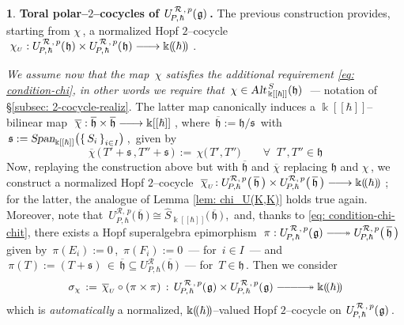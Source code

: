 \documentclass[12pt,reqno,twoside,a4paper]{amsart}
\numberwithin{equation}{section}
\theoremstyle{definition}
\newtheorem{free text}[lema]{}
\theoremstyle{remark}
\newcommand{\R}{{\mathcal R}}
\def \kh{{\Bbbk[[\hbar]]}}
\def \khp{{\Bbbk(\hskip-1,7pt(\hbar)\hskip-1,7pt)}}
\def \lieg{\mathfrak{g}}
\def \lieh{\mathfrak{h}}
\def \lies{\mathfrak{s}}
\def \uRpPhg{U^{\,\R\,,\,p}_{\!P,\hskip0,7pt\hbar}(\hskip0,5pt\lieg)}
\def \uRpPhh{U^{\,\R\,,\,p}_{\!P,\hskip0,7pt\hbar}(\hskip0,5pt\lieh)}
\theoremstyle{plain}
\begin{document}
\begin{free text}  \label{toral-cocycles-uPhgd}
%
 {\bf Toral  polar--$ 2 $--cocycles of  $ \uRpPhg \, $.}
%
 The previous construction provides, starting from  $ \chi \, $,  a normalized Hopf\/  $ 2 $--cocycle
 $ \; \chi_{\scriptscriptstyle U} : \uRpPhh \times \uRpPhh
 \relbar\joinrel\longrightarrow \khp \; $.

\vskip5pt

   \textit{We assume now that the map  $ \, \chi $  satisfies the additional requirement\/  \eqref{eq: condition-chi},  in other words we require that  $ \, \chi \in \text{\sl Alt}_{\,\kh}^{\,S}(\lieh) \, $   --- }
 notation of  \S \ref{subsec: 2-cocycle-realiz}.  The latter map canonically induces a  $ \kh $--bilinear  map
 $ \; \overline{\chi} : \overline{\lieh} \times \overline{\lieh}
\relbar\joinrel\longrightarrow \kh \; $,  \;where  $ \, \overline{\lieh} := \lieh \big/ \lies \, $  with
$ \, \lies := \textsl{Span}_\kh\big( {\{\, S_i \,\}}_{i \in I} \big)\, $,  \,given by
%
$$
\overline{\chi}\,\big(\, T' \! + \lies \, , T'' \! + \lies \,\big)
\, := \, \chi\big(\,T',T''\big)   \qquad  \forall \;\; T' , T'' \in \lieh
%
$$
%
   \indent   Now, replaying the construction above but with  $ \overline{\lieh} $  and
   $ \overline{\chi} $  replacing  $ \lieh $  and  $ \chi \, $,
   we construct a normalized Hopf\/  $ 2 $--cocycle
   $ \; \overline{\chi}_{\scriptscriptstyle U} \!: U_{\!P,\hbar}^{\R,\,p}\big(\,\overline{\lieh}\,\big) \times
   U_{\!P,\hbar}^{\R,\,p}\big(\,\overline{\lieh}\,\big) \relbar\joinrel\longrightarrow \khp \; $;
for the latter, the analogue of  Lemma \ref{lem: chi_U(K,K)}  holds true again.  Moreover,
  note that  $ \, U_{\!P,\hbar}^{\R,\,p}\big(\,\overline{\lieh}\,\big) \cong \widehat{S}_\kh\big(\,\overline{\lieh}\,\big) \, $,  \,and,
thanks to  \eqref{eq: condition-chi-chit},
 there exists a Hopf superalgebra epimorphism
 $ \; \pi : \uRpPhg \relbar\joinrel\relbar\joinrel\twoheadrightarrow U_{\!P,\hbar}^{\R,\,p}\big(\,\overline{\lieh}\,\big) \; $
 given by  $ \, \pi(E_i) := 0 \, $,  $ \, \pi(F_i) := 0 \, $   --- for  $ \, i \in I \, $  ---   and
 $ \, \pi(T) := (T + \lies) \, \in \, \overline{\lieh} \subseteq U_{\!P,\hbar}^\R\big(\,\overline{\lieh}\,\big) \, $
 --- for  $ \, T \in \lieh \, $.
 Then we consider
%
  $$  \sigma_\chi \, := \, \overline{\chi}_{\scriptscriptstyle U} \circ (\pi \times \pi) \, : \, \uRpPhg \times \uRpPhg \relbar\joinrel\relbar\joinrel\relbar\joinrel\relbar\joinrel\twoheadrightarrow \khp  $$
%
 which is  \textsl{automatically\/}  a normalized,  $ \khp $--valued  Hopf\/  $ 2 $--cocycle  on  $ \uRpPhg \, $.
%
\end{free text}
\end{document}

